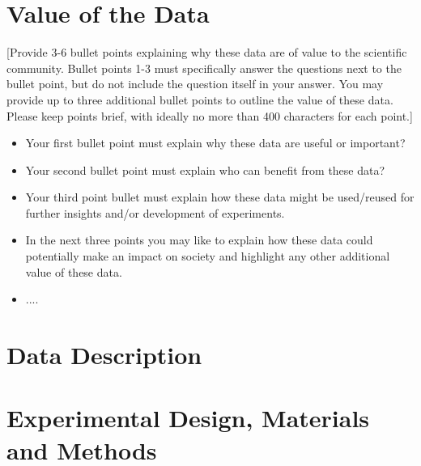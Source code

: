 \documentclass[times,final]{elsarticle.cls}
\begin{document}
\section*{Value of the Data}

[Provide 3-6 bullet points explaining why these data are of value to the scientific community. 
Bullet points 1-3 must specifically answer the questions next to the bullet point, 
but do not include the question itself in your answer. You may 
provide up to three additional bullet points to outline the value of these data. 
Please keep points brief, with ideally no more than 400 characters for each point.]

\begin{itemize}
\itemsep=0pt
\parsep=0pt
\item Your first bullet point must explain why these data are useful or important? 
\item Your second bullet point must explain who can benefit from these data?
\item Your third point bullet must explain how these data might be used/reused for 
further insights and/or development of experiments.
\item In the next three points you may like to explain how these data could 
potentially make an impact on society and highlight any other additional value of these data.
\item ....
\end{itemize}

\section*{Data Description}


\section*{Experimental Design, Materials and Methods}
\end{document}
